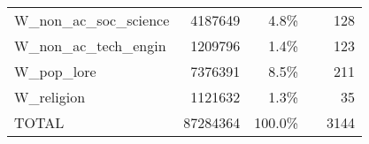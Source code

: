 {\begin{tabular}{lrrcr}
        W\_non\_ac\_soc\_science           & 4187649  & 4.8\%   &                                                         & 128   \\
        W\_non\_ac\_tech\_engin            & 1209796  & 1.4\%   &                                                         & 123   \\ \cline{4-4}
        W\_pop\_lore                       & 7376391  & 8.5\%   &                                                         & 211   \\
        W\_religion                        & 1121632  & 1.3\%   &                                                         & 35    \\ \hline
        TOTAL                              & 87284364 & 100.0\% &                                                         & 3144  \\ \hline
    \end{tabular}

}
